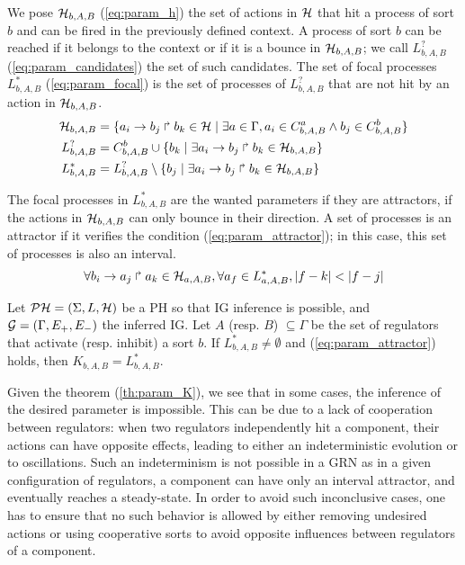 We pose $\mathcal{H}_{b,A,B}$ (\eqref{eq:param_h}) the set of actions in $\mathcal{H}$ that hit a process of sort $b$ and can be fired in the previously defined context. A process of sort $b$ can be reached if it belongs to the context or if it is a bounce in $\mathcal{H}_{b,A,B}$; we call $L_{b,A,B}^?$ (\ref{eq:param_candidates}) the set of such candidates. The set of focal processes $L_{b,A,B}^*$ (\ref{eq:param_focal}) is the set of processes of $L_{b,A,B}^?$ that are not hit by an action in $\mathcal{H}_{b,A,B}$.
\begin{align}
\label{eq:param_h}
  \mathcal{H}_{b,A,B} & = \{ a_i\rightarrow b_j\Rsh b_k \in \mathcal{H} \mid \exists a \in \Gamma, a_i \in C_{b,A,B}^a \wedge b_j \in C_{b,A,B}^b\}
\\
\label{eq:param_candidates}
  L_{b,A,B}^? & =  C_{b,A,B}^b \cup \{ b_k\mid \exists a_i\rightarrow b_j\Rsh b_k \in \mathcal{H}_{b,A,B}\}
\\
\label{eq:param_focal}
  L_{b,A,B}^* & =  L_{b,A,B}^? \setminus \{ b_j \mid \exists a_i\rightarrow b_j\Rsh b_k \in \mathcal{H}_{b,A,B} \}
\end{align}

The focal processes in $L_{b,A,B}^*$ are the wanted parameters if they are attractors, \ie if the actions in $\mathcal{H}_{b,A,B}$ can only bounce in their direction. A set of processes is an attractor if it verifies the condition (\ref{eq:param_attractor}); in this case, this set of processes is also an interval.
\begin{align}
\label{eq:param_attractor}
  \forall b_i\rightarrow a_j\Rsh a_k \in \mathcal{H}_{a,A,B}, \forall a_f \in L_{a,A,B}^*, |f-k| < |f-j|
\end{align}

\begin{theorem}
\label{th:param_K}
Let $\mathcal{PH} = (\Sigma, L, \mathcal{H})$ be a PH so that IG inference is possible, and $\mathcal{G} = (\Gamma, E_+, E_-)$ the inferred IG.
Let $A$ (resp. $B$) $\subseteq \Gamma$ be the set of regulators that activate (resp. inhibit) a sort $b$.
If $L_{b,A,B}^* \neq \emptyset$ and (\ref{eq:param_attractor}) holds, then $K_{b,A,B} = L_{b,A,B}^*$.
\end{theorem}


Given the theorem (\ref{th:param_K}), we see that in some cases, the inference of the desired parameter is impossible. This can be due to a lack of cooperation between regulators: when two regulators independently hit a component, their actions can have opposite effects, leading to either an indeterministic evolution or to oscillations. Such an indeterminism is not possible in a GRN as in a given configuration of regulators, a component can have only an interval attractor, and eventually reaches a steady-state. In order to avoid such inconclusive cases, one has to ensure that no such behavior is allowed by either removing undesired actions or using cooperative sorts to avoid opposite influences between regulators of a component.

